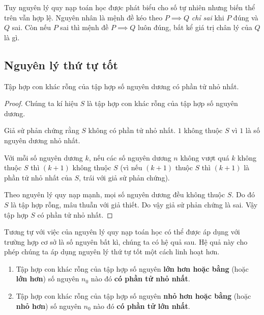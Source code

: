 Tuy nguyên lý quy nạp toán học được phát biểu cho số tự nhiên nhưng biến thể trên vẫn hợp lệ. Nguyên nhân là mệnh đề kéo theo $P\implies Q$ \textit{chỉ sai} khi $P$ đúng và $Q$ sai. Còn nếu $P$ sai thì mệnh đề $P\implies Q$ luôn đúng, bất kể giá trị chân lý của $Q$ là gì.

\subsection{Nguyên lý thứ tự tốt}

\begin{theorem}
    Tập hợp con khác rỗng của tập hợp số nguyên dương có phần tử nhỏ nhất.
\end{theorem}

\begin{proof}
    Chúng ta kí hiệu $S$ là tập hợp con khác rỗng của tập hợp số nguyên dương.

    Giả sử phản chứng rằng $S$ không có phần tử nhỏ nhất. $1$ không thuộc $S$ vì $1$ là số nguyên dương nhỏ nhất.

    Với mỗi số nguyên dương $k$, nếu các số nguyên dương $n$ không vượt quá $k$ không thuộc $S$ thì $(k+1)$ không thuộc $S$ (vì nếu $(k+1)$ thuộc $S$ thì $(k+1)$ là phần tử nhỏ nhất của $S$, trái với giả sử phản chứng).

    Theo nguyên lý quy nạp mạnh, mọi số nguyên dương đều không thuộc $S$. Do đó $S$ là tập hợp rỗng, mâu thuẫn với giả thiết. Do vậy giả sử phản chứng là sai. Vậy tập hợp $S$ có phần tử nhỏ nhất.
\end{proof}

Tương tự với việc của nguyên lý quy nạp toán học có thể được áp dụng với trường hợp cơ sở là số nguyên bất kì, chúng ta có hệ quả sau. Hệ quả này cho phép chúng ta áp dụng nguyên lý thứ tự tốt một cách linh hoạt hơn.
\begin{corollary}
    \begin{enumerate}[label={(\roman*)}]
        \item Tập hợp con khác rỗng của tập hợp số nguyên \textbf{lớn hơn hoặc bằng} (hoặc \textbf{lớn hơn}) số nguyên $n_{0}$ nào đó \textbf{có phần tử nhỏ nhất}.
        \item Tập hợp con khác rỗng của tập hợp số nguyên \textbf{nhỏ hơn hoặc bằng} (hoặc \textbf{nhỏ hơn}) số nguyên $n_{0}$ nào đó \textbf{có phần tử lớn nhất}.
    \end{enumerate}
\end{corollary}

